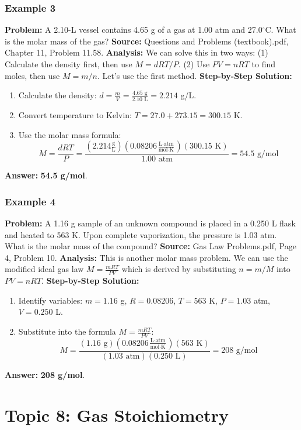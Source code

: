 \documentclass{article}
\begin{document}
\subsubsection{Example 3}
\textbf{Problem:} A 2.10-L vessel contains 4.65 g of a gas at 1.00 atm and 27.0$^\circ$C. What is the molar mass of the gas?
\textbf{Source:} Questions and Problems (textbook).pdf, Chapter 11, Problem 11.58.
\textbf{Analysis:} We can solve this in two ways: (1) Calculate the density first, then use $M=dRT/P$. (2) Use $PV=nRT$ to find moles, then use $M=m/n$. Let's use the first method.
\textbf{Step-by-Step Solution:}
\begin{enumerate}
    \item Calculate the density: $d = \frac{m}{V} = \frac{4.65 \text{ g}}{2.10 \text{ L}} = 2.214$ g/L.
    \item Convert temperature to Kelvin: $T = 27.0 + 273.15 = 300.15$ K.
    \item Use the molar mass formula:
    \[ M = \frac{dRT}{P} = \frac{(2.214 \frac{\text{g}}{\text{L}})(0.08206 \frac{\text{L}\cdot\text{atm}}{\text{mol}\cdot\text{K}})(300.15 \text{ K})}{1.00 \text{ atm}} = 54.5 \text{ g/mol} \]
\end{enumerate}
\textbf{Answer:} \textbf{54.5 g/mol}.

\subsubsection{Example 4}
\textbf{Problem:} A 1.16 g sample of an unknown compound is placed in a 0.250 L flask and heated to 563 K. Upon complete vaporization, the pressure is 1.03 atm. What is the molar mass of the compound?
\textbf{Source:} Gas Law Problems.pdf, Page 4, Problem 10.
\textbf{Analysis:} This is another molar mass problem. We can use the modified ideal gas law $M = \frac{mRT}{PV}$ which is derived by substituting $n=m/M$ into $PV=nRT$.
\textbf{Step-by-Step Solution:}
\begin{enumerate}
    \item Identify variables: $m = 1.16$ g, $R = 0.08206$, $T=563$ K, $P=1.03$ atm, $V=0.250$ L.
    \item Substitute into the formula $M = \frac{mRT}{PV}$:
    \[ M = \frac{(1.16 \text{ g})(0.08206 \frac{\text{L}\cdot\text{atm}}{\text{mol}\cdot\text{K}})(563 \text{ K})}{(1.03 \text{ atm})(0.250 \text{ L})} = 208 \text{ g/mol} \]
\end{enumerate}
\textbf{Answer:} \textbf{208 g/mol}.

\section{Topic 8: Gas Stoichiometry}
\end{document}
